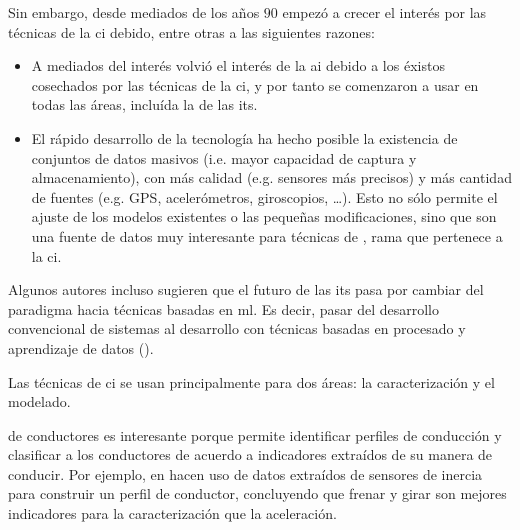 Sin embargo, desde mediados de los años $90$ empezó a crecer el interés por las técnicas de la \gls{ci} debido, entre otras a las siguientes razones:

\begin{itemize}
	\item A mediados del interés volvió el interés de la \gls{ai} debido a los éxistos cosechados por las técnicas de la \gls{ci}, y por tanto se comenzaron a usar en todas las áreas, incluída la de las its.
	\item El rápido desarrollo de la tecnología ha hecho posible la existencia de conjuntos de datos masivos (i.e. mayor capacidad de captura y almacenamiento), con más calidad (e.g. sensores más precisos) y más cantidad de fuentes (e.g. GPS, acelerómetros, giroscopios, \ldots). Esto no sólo permite el ajuste de los modelos existentes o las pequeñas modificaciones, sino que son una fuente de datos muy interesante para técnicas de , rama que pertenece a la \gls{ci}.
\end{itemize}

Algunos autores incluso sugieren que el futuro de las \gls{its} pasa por cambiar del paradigma hacia técnicas basadas en \gls{ml}. Es decir, pasar del desarrollo convencional de sistemas al desarrollo con técnicas basadas en procesado y aprendizaje de datos (\cite{Zhang2011}).

Las técnicas de \gls{ci} se usan principalmente para dos áreas: la caracterización y el modelado.

 de conductores es interesante porque permite identificar perfiles de conducción y clasificar a los conductores de acuerdo a indicadores extraídos de su manera de conducir. Por ejemplo, en \cite{van2013driver} hacen uso de datos extraídos de sensores de inercia para construir un perfil de conductor, concluyendo que frenar y girar son mejores indicadores para la caracterización que la aceleración.

